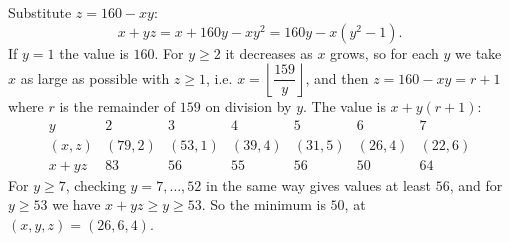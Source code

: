 Substitute $z=160-xy$:
\[x+yz=x+160y-xy^2=160y-x(y^2-1).\]
If $y=1$ the value is $160$. For $y\ge2$ it decreases as $x$ grows, so for each $y$ we take $x$ as large as possible with $z\ge1$, i.e. $x=\left\lfloor\dfrac{159}{y}\right\rfloor$, and then $z=160-xy=r+1$ where $r$ is the remainder of $159$ on division by $y$. The value is $x+y(r+1)$:
\[\begin{array}{c|cccccc}
y&2&3&4&5&6&7\\\hline
(x,z)&(79,2)&(53,1)&(39,4)&(31,5)&(26,4)&(22,6)\\
x+yz&83&56&55&56&50&64
\end{array}\]
For $y\ge7$, checking $y=7,\dots,52$ in the same way gives values at least $56$, and for $y\ge53$ we have $x+yz\ge y\ge53$. So the minimum is $\boxed{50}$, at $(x,y,z)=(26,6,4)$.
